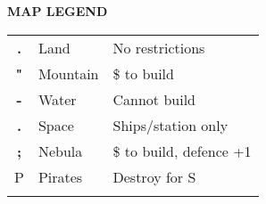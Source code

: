 \begin{flushleft}
\textbf{MAP LEGEND}
\end{flushleft}
\begin{tabular}{|c|ll}
\hhline{-}
\cellcolor{land}\textbf{.} & Land
                           & {\color{supplemental} No restrictions}       \\ \hhline{-}
\cellcolor{mountain}\textbf{"} & Mountain
                           & {\color{supplemental} \$ to build}           \\ \hhline{-}
\cellcolor{water}\textbf{-} & Water
                           & {\color{supplemental} Cannot build}          \\ \hhline{-}
\cellcolor{space}\textcolor{stars}{\textbf{.}}            & Space
                           & {\color{supplemental} Ships/station only} \\ \hhline{-}
\cellcolor{nebula}\textcolor{stars}{\textbf{;}} & Nebula
                           & {\color{supplemental} \$ to build, defence +1}       \\ \hhline{-}
P & Pirates
                           & {\color{supplemental} Destroy for S}         \\ \hhline{-}
\end{tabular}
